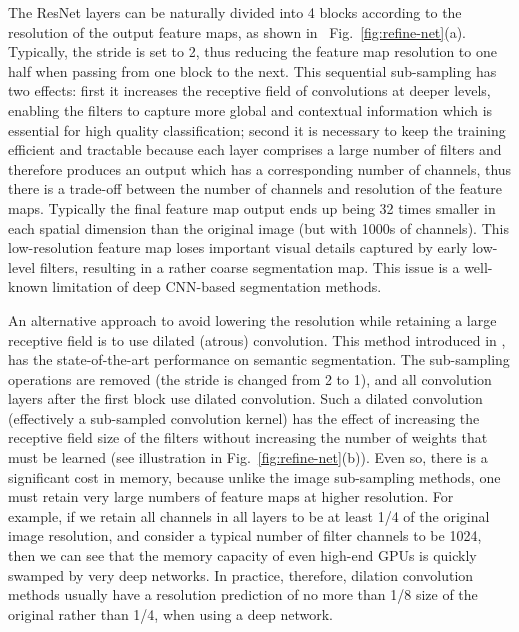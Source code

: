 \documentclass[10pt,twocolumn,letterpaper]{article}
\newcommand{\Fig}{Fig.\xspace}
\begin{document}
The ResNet layers can be naturally divided into 4 blocks according to the resolution of the output feature maps, as shown in ~\Fig~\ref{fig:refine-net}(a).
Typically, the stride is set to 2, thus reducing the feature map resolution to one half when passing from one block to the next. This sequential sub-sampling has two effects: first it increases the receptive field of convolutions at deeper levels, enabling the filters to capture more global and contextual information which is essential for high quality classification; second it is necessary to keep the training efficient and tractable because each layer comprises a large number of filters and therefore produces an output which has a corresponding number of channels, thus there is a trade-off between the number of channels and resolution of the feature maps. Typically the final feature map output ends up being 32 times smaller in each spatial dimension than the original image (but with 1000s of channels). 
This low-resolution feature map loses important visual details captured by early low-level filters, resulting in a rather coarse segmentation map.
This issue is a well-known limitation of deep CNN-based segmentation methods. 




An alternative approach to avoid lowering the resolution while retaining a large receptive field is to use dilated (atrous) convolution.  This method introduced in \cite{ChenPK0Y16}, has the state-of-the-art performance on semantic segmentation.  The sub-sampling operations are removed (the stride is changed from 2 to 1), and all convolution layers after the first block use dilated convolution.  Such a dilated convolution (effectively a sub-sampled convolution kernel) has the effect of increasing the receptive field size of the filters without increasing the number of weights that must be learned (see illustration in \Fig~\ref{fig:refine-net}(b)). Even so, there is a significant cost in memory, because unlike the image sub-sampling methods, one must retain very large numbers of feature maps at higher resolution.  For example, if we retain all channels in all layers to be at least 1/4 of the original image resolution, and consider a typical number of filter channels to be 1024, then we can see that the memory capacity of even high-end GPUs is quickly swamped by very deep networks.  In practice, therefore, dilation convolution methods usually have a resolution prediction of no more than 1/8 size of the original rather than 1/4, when using a deep network. 
  
\end{document}
